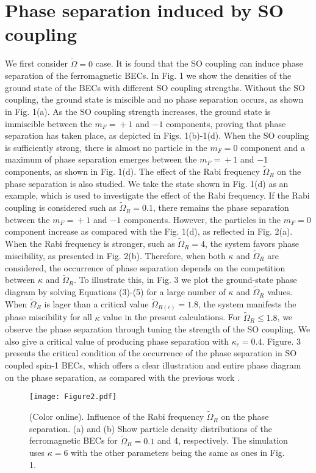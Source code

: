 \documentclass[aps,pra,showpacs,twocolumn,superscriptaddress]{revtex4-1}
\begin{document}
\section{Phase separation induced by SO coupling}
We first consider $\tilde{\Omega}=0$ case. It is found that the SO coupling can induce phase separation of the ferromagnetic BECs. In Fig. 1 we show the densities of the ground state of the BECs with different SO coupling strengths. Without the SO coupling, the ground state is miscible and no phase separation occurs, as shown in Fig. 1(a). As the SO coupling strength increases, the ground state is immiscible between the $m_{F}\!=\!+1$ and $-1$ components, proving that phase separation has taken place, as depicted in Figs. 1(b)-1(d). When the SO coupling is sufficiently strong, there is almost no particle in the $m_{F}\!=\!0$ component and a maximum of phase separation emerges between the $m_{F}\!=\!+1$ and $-1$ components, as shown in Fig. 1(d). The effect of the Rabi frequency $\tilde{\Omega}_{R}$ on the phase separation is also studied. We take the state shown in Fig. 1(d) as an example, which is used to investigate the effect of the Rabi frequency. If the Rabi coupling is considered such as $\tilde{\Omega}_{R}=0.1$, there remains the phase separation between the $m_{F}\!=\!+1$ and $-1$ components. However, the particles in the $m_{F}\!=\!0$ component increase as compared with the Fig. 1(d), as reflected in Fig. 2(a). When the Rabi frequency is stronger, such as $\tilde{\Omega}_{R}=4$, the system favors phase miscibility, as presented in Fig. 2(b). Therefore, when both $\kappa$ and $\tilde{\Omega}_{R}$ are considered, the occurrence of phase separation depends on the competition between $\kappa$ and $\tilde{\Omega}_{R}$. To illustrate this, in Fig. 3 we plot the
ground-state phase diagram by solving Equations (3)-(5) for a large number of $\kappa$ and $\tilde{\Omega}_{R}$ values.
When $\tilde{\Omega}_{R}$ is lager than a critical value $\tilde{\Omega}_{R(c)}=1.8$, the system manifests the phase miscibility for all $\kappa$ value in the present calculations. For $\tilde{\Omega}_{R}\leq1.8$, we observe the phase separation through tuning the strength of the SO coupling. We also give a critical value of producing phase separation with $\kappa_{c}=0.4$. Figure. 3 presents the critical condition of the occurrence of the phase separation in SO coupled spin-1 BECs, which offers a clear illustration and entire phase diagram on the phase separation, as compared with the previous work \cite{Gautam2014}.

\begin{figure}
\texttt{[image: Figure2.pdf]}
\caption{(Color online). Influence of the Rabi frequency $\widetilde{\Omega}_{R}$ on the phase separation. (a) and (b) Show particle density distributions of the ferromagnetic BECs for $\widetilde{\Omega}_{R}=0.1$ and 4, respectively. The simulation uses $\kappa=6$ with the other parameters being the same as ones in Fig. 1.} \label{Figure2}
\end{figure}
\end{document}
